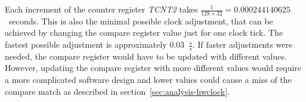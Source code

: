Each increment of the counter register {\it{TCNT2}} takes
$\frac{1}{128 \times 32} = 0.000244140625$~seconds.
This is also the minimal possible clock adjustment,
that can be achieved by changing the compare register value just for one clock tick.
The fastest possible adjustment is approximately 0.03~$\frac{s}{s}$.
If faster adjustments were needed, the compare register would have to be updated with different values. 
However, updating the compare register with more different values would require
a more complicated software design
and lower values could cause a miss of the compare match as described in section~\ref{sec:analysis-hwclock}.

